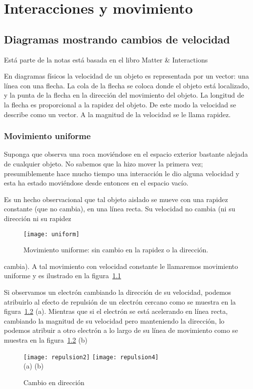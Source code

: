 
\chapter{Interacciones y movimiento}

 
\section{Diagramas mostrando cambios de velocidad}

Está parte de la notas está basada en el libro Matter \& Interactions \cite{MI}

En diagramas físicos la velocidad de un objeto es representada por un
vector: una línea con una flecha. La cola de la flecha se coloca donde
el objeto está localizado, y la punta de la flecha en la dirección del
movimiento del objeto. La longitud de la flecha es proporcional a la
rapidez del objeto. De este modo la velocidad se describe como un
vector. A la magnitud de la velocidad se le llama rapidez.

\subsection{Movimiento uniforme}
Suponga que observa una roca moviéndose en el espacio exterior
bastante alejada de cualquier objeto. No sabemos que la hizo mover la
primera vez; presumiblemente hace mucho tiempo una interacción le dio
alguna velocidad y esta ha estado moviéndose desde entonces en el
espacio vacío.

Es un hecho observacional que tal objeto aislado se mueve con una
rapidez constante (que no cambia), en una línea recta. Su velocidad no
cambia (ni su dirección ni su rapidez
\begin{figure}
  \centering
  \texttt{[image: uniform]}
  \caption{Movimiento uniforme: sin cambio en la rapidez o la dirección.}
  \label{fig:uniform}
\end{figure}
cambia). A tal movimiento con
velocidad constante le llamaremos movimiento uniforme y es ilustrado
en la figura~\ref{fig:uniform}

Si observamos un electrón cambiando la dirección de su velocidad,
podemos atribuirlo al efecto de repulsión de un electrón cercano como
se muestra en la figura~\ref{fig:repulsion2} (a). Mientras que si el
electrón se está acelerando en línea recta, cambiando la magnitud de
su velocidad pero manteniendo la dirección, lo podemos atribuir a otro
electrón a lo largo de su línea de movimiento como se muestra en la
figura~\ref{fig:repulsion2} (b)
\begin{figure}
  \centering
  \texttt{[image: repulsion2]} \texttt{[image: repulsion4]}\\
    (a) \hspace{5cm} (b)
  \caption{Cambio en dirección}
  \label{fig:repulsion2}
\end{figure}

